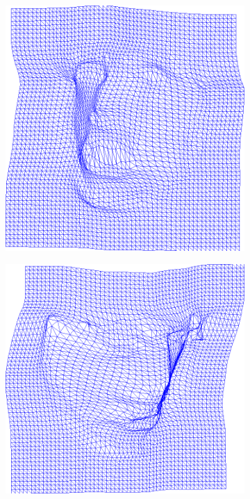 \begin{figure}[t!]
\begin{subfigure}[b]{0.15\textwidth}
    \end{subfigure}
    \\
    \begin{subfigure}[b]{0.15\textwidth}
            \includegraphics[width=\textwidth]{resources/Fig_Flows/6}
    \end{subfigure}
    \hfill
    \begin{subfigure}[b]{0.15\textwidth}
            \includegraphics[width=\textwidth]{resources/Fig_Flows/7}

\end{subfigure}
\end{figure}
